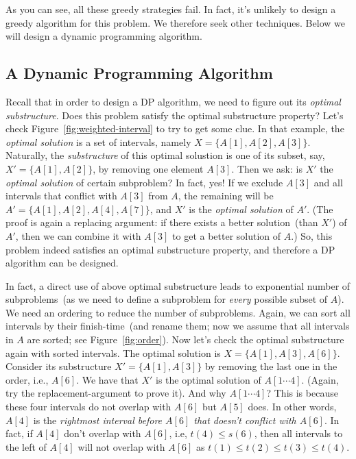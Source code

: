 As you can see, all these greedy strategies fail. In fact, it's unlikely to design a greedy algorithm for this problem.
We therefore seek other techniques. Below we will design a dynamic programming algorithm.

\subsection*{A Dynamic Programming Algorithm}

Recall that in order to design a DP algorithm, we need to figure out its \emph{optimal substructure}.
Does this problem satisfy the optimal substructure property?
Let's check Figure~\ref{fig:weighted-interval} to try to get some clue.
In that example, the \emph{optimal solution} is a set of intervals, namely $X = \{A[1], A[2], A[3]\}$.
Naturally, the \emph{substructure} of this optimal solustion is one of its subset, say, $X' = \{A[1], A[2]\}$, by removing one element $A[3]$.
Then we ask: is $X'$ the \emph{optimal solution} of certain subproblem?
In fact, yes! If we exclude $A[3]$ and all intervals that conflict with $A[3]$ from $A$,
the remaining will be $A' = \{A[1], A[2], A[4], A[7]\}$, and $X'$ is 
the \emph{optimal solution} of $A'$. (The proof is again a replacing argument: if there exists a
better solution~(than $X'$) of $A'$, then we can combine it with $A[3]$ to get a better solution of $A$.)
So, this problem indeed satisfies an optimal substructure property, and therefore a DP algorithm can be designed.

In fact, a direct use of above optimal substructure leads to exponential number of subproblems~(as we need to
define a subproblem for \emph{every} possible subset of $A$). We need an ordering to reduce
the number of subproblems.  Again, we can sort all intervals by their finish-time~(and rename them;
now we assume that all intervals in $A$ are sorted; see Figure~\ref{fig:order}).
Now let's check the optimal substructure again with sorted intervals.
The optimal solution is $X = \{A[1], A[3], A[6]\}$.
Consider its substructure $X' = \{A[1], A[3]\}$ by removing the last one in the order, i.e., $A[6]$.
We have that $X'$ is the optimal solution of $A[1\cdots 4]$. (Again, try the replacement-argument to prove it).
And why $A[1\cdots 4]$? This is because these four intervals do not overlap with $A[6]$ but $A[5]$ does.
In other words, $A[4]$ is the \emph{rightmost interval before $A[6]$ that doesn't conflict with $A[6]$}.
In fact, if $A[4]$ don't overlap with $A[6]$, i.e, $t(4)\le s(6)$, then all intervals to the left of $A[4]$ will not overlap with $A[6]$
as $t(1) \le t(2) \le t(3) \le t(4)$. 

